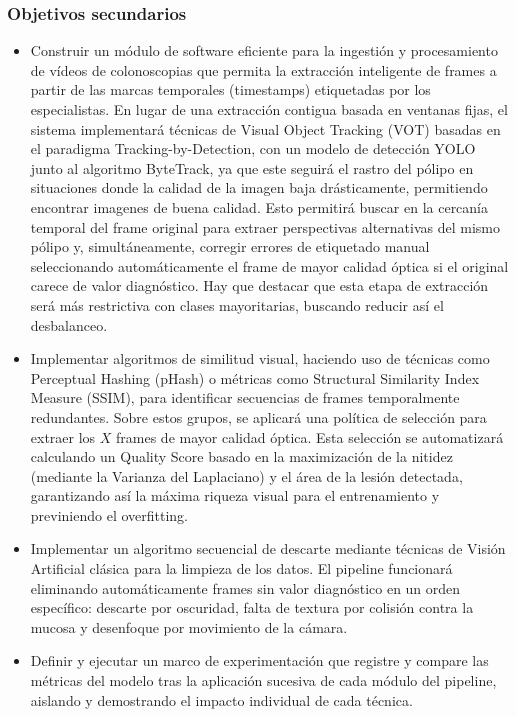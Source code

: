 ﻿\documentclass[10pt,a4paper,twocolumn,twoside]{article}
\begin{document}
\subsubsection{Objetivos secundarios}
\begin{itemize}
    \item Construir un módulo de software eficiente para la ingestión y procesamiento de vídeos de colonoscopias que permita la extracción inteligente de frames a partir de las marcas temporales (timestamps) etiquetadas por los especialistas. En lugar de una extracción contigua basada en ventanas fijas, el sistema implementará técnicas de Visual Object Tracking (VOT) basadas en el paradigma Tracking-by-Detection, con un modelo de detección YOLO junto al algoritmo ByteTrack\cite{zhang2022bytetrack}, ya que este seguirá el rastro del pólipo en situaciones donde la calidad de la imagen baja drásticamente, permitiendo encontrar imagenes de buena calidad. Esto permitirá buscar en la cercanía temporal del frame original para extraer perspectivas alternativas del mismo pólipo y, simultáneamente, corregir errores de etiquetado manual seleccionando automáticamente el frame de mayor calidad óptica si el original carece de valor diagnóstico. Hay que destacar que esta etapa de extracción será más restrictiva con clases mayoritarias, buscando reducir así el desbalanceo.
    \item Implementar algoritmos de similitud visual, haciendo uso de técnicas como Perceptual Hashing (pHash) o métricas como Structural Similarity Index Measure (SSIM), para identificar secuencias de frames temporalmente redundantes. Sobre estos grupos, se aplicará una política de selección para extraer los $X$ frames de mayor calidad óptica. Esta selección se automatizará calculando un Quality Score basado en la maximización de la nitidez (mediante la Varianza del Laplaciano) y el área de la lesión detectada, garantizando así la máxima riqueza visual para el entrenamiento y previniendo el overfitting.
    \item Implementar un algoritmo secuencial de descarte mediante técnicas de Visión Artificial clásica para la limpieza de los datos. El pipeline funcionará eliminando automáticamente frames sin valor diagnóstico en un orden específico: descarte por oscuridad, falta de textura por colisión contra la mucosa y desenfoque por movimiento de la cámara.
    \item Definir y ejecutar un marco de experimentación que registre y compare las métricas del modelo tras la aplicación sucesiva de cada módulo del pipeline, aislando y demostrando el impacto individual de cada técnica.
\end{itemize}
\end{document}

